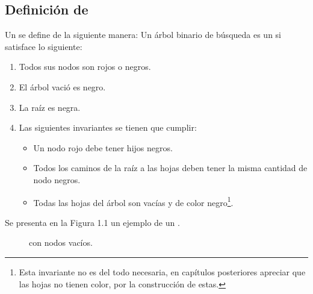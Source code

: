 \subsection{Definici\'on de {\arns}}
Un {\arn} se define de la siguiente manera:
Un \'arbol binario de búsqueda es un {\arn} si satisface lo siguiente:
\begin{enumerate}
    \item Todos sus nodos son rojos o negros.
    \item El \'arbol vació es negro.
    \item La raíz es negra.
    \item Las siguientes invariantes se tienen que cumplir:
    \begin{itemize}
        \item Un nodo rojo debe tener hijos negros.
        \item Todos los caminos de la raíz a las hojas deben tener la misma cantidad de nodo
        negros.
        \item Todas las hojas del \'arbol son vacías y de color negro\footnote{Esta invariante no
        es del todo necesaria, en capítulos posteriores apreciar que las hojas no tienen color,
        por la construcción de estas.}.
    \end{itemize}
\end{enumerate}

Se presenta en la Figura 1.1 un ejemplo de un {\arn}.

\begin{figure}
\centering
\captionsetup{justification=centering}
\label{arbolRB_1}
\caption {\Arn con nodos vac\'ios.}
\end{figure}


